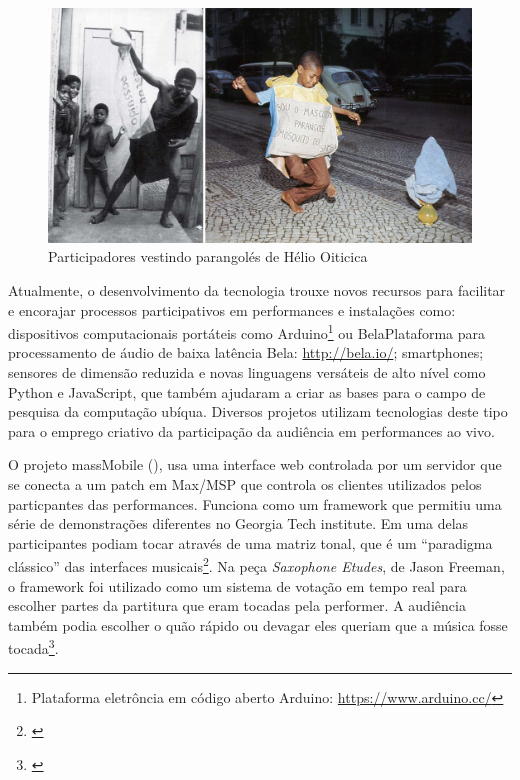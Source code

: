 \begin{figure}
    \caption{\label{parangole}Participadores vestindo parangolés de Hélio Oiticica}
    \begin{center}
        \includegraphics[width=1\linewidth]{pictures/cap3/parangole}
    \end{center}
\end{figure}

Atualmente, o desenvolvimento da tecnologia trouxe novos recursos para facilitar e encorajar processos participativos em performances e instalações como: dispositivos computacionais portáteis como Arduino\footnote{Plataforma eletrôncia em código aberto Arduino: \url{https://www.arduino.cc/}} ou Bela{Plataforma para processamento de áudio de baixa latência Bela: \url{http://bela.io/}}; smartphones; sensores de dimensão reduzida e novas linguagens versáteis de alto nível como Python e JavaScript, que também ajudaram a criar as bases para o campo de pesquisa da computação ubíqua. Diversos projetos utilizam tecnologias deste tipo para o emprego criativo da participação da audiência em performances ao vivo.

O projeto massMobile (\citeyear{Weitzner2012}), usa uma interface web controlada por um servidor que se conecta a um patch em Max/MSP que controla os clientes utilizados pelos particpantes das performances. Funciona como um framework que permitiu uma série de demonstrações diferentes no Georgia Tech institute. Em uma delas participantes podiam tocar através de uma matriz tonal, que é um ``paradigma clássico'' das interfaces musicais\footnote{\cite{Weitzner2012}}. Na peça \emph{Saxophone Etudes}, de Jason Freeman, o framework foi utilizado como um sistema de votação em tempo real para escolher partes da partitura que eram tocadas pela performer. A audiência também podia escolher o quão rápido ou devagar eles queriam que a música fosse tocada\footnote{\cite{Freeman}}.  


